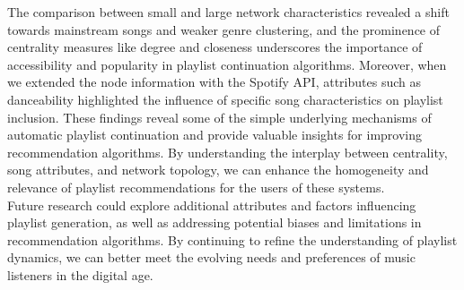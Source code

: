 \documentclass[conference]{IEEEtran}
\begin{document}
The comparison between small and large network characteristics revealed a shift towards mainstream songs and weaker genre clustering, and the prominence of centrality measures like degree and closeness underscores the importance of accessibility and popularity in playlist continuation algorithms. Moreover, when we extended the node information with the Spotify API, attributes such as danceability highlighted the influence of specific song characteristics on playlist inclusion. These findings reveal some of the simple underlying mechanisms of automatic playlist continuation and provide valuable insights for improving recommendation algorithms. By understanding the interplay between centrality, song attributes, and network topology, we can enhance the homogeneity and relevance of playlist recommendations for the users of these systems. \\

Future research could explore additional attributes and factors influencing playlist generation, as well as addressing potential biases and limitations in recommendation algorithms. By continuing to refine the understanding of playlist dynamics, we can better meet the evolving needs and preferences of music listeners in the digital age. \\

\end{document}
